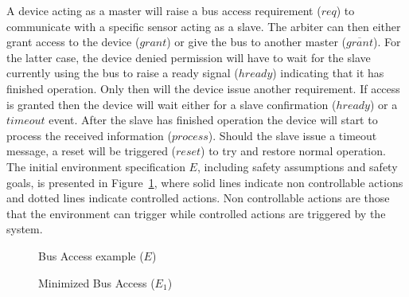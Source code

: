 A device acting as a master will raise a bus access requirement ($req$) 
to communicate with a specific sensor acting as a slave. 
The arbiter can then either grant access to the device ($grant$) or give the bus
to another master ($\overline{grant}$). For the latter case, the device denied permission will have to wait for the slave currently using the bus to raise a
ready signal ($hready$) indicating that it has finished operation.  Only then
will the device issue another requirement.  If access is granted then the device
will wait either for a slave confirmation ($hready$) or a $timeout$ event.
After the slave has finished operation the device will start to process the
received information ($process$). Should the slave issue a timeout message, a reset will be triggered ($reset$) to try and restore normal operation.  
The initial environment specification $E$, including safety assumptions and safety goals, is presented in Figure~\ref{fig:req_grant}, where
solid lines indicate non controllable actions and dotted lines indicate
controlled actions.  Non controllable actions are those that the environment
can trigger while controlled actions are triggered by the system. 
\begin{figure}[bt]
\centering
\SmallPicture
{}
\caption{Bus Access example ($E$)}
\label{fig:req_grant}
\MediumPicture
\end{figure}
\begin{figure}[bt]
\centering
\SmallPicture
{}
\caption{Minimized Bus Access ($E_1$)}
\label{fig:req_grant_sub_1}
\MediumPicture
\end{figure}
